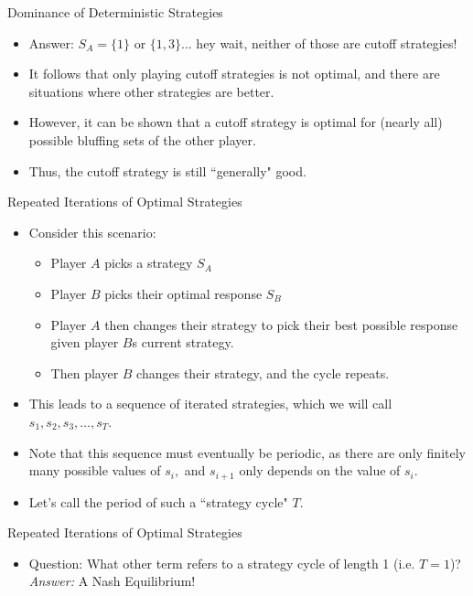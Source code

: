 \documentclass[aspectratio=169]{beamer}
\begin{document}
\begin{frame}{Dominance of Deterministic Strategies}
\begin{itemize}
    \item Answer: $S_A = \{1\}$ or $\{1,3\}$... hey wait, neither of those are cutoff strategies! \pause
    \item It follows that only playing cutoff strategies is not optimal, and there are situations where other strategies are better. \pause
    \item However, it can be shown that a cutoff strategy is optimal for (nearly all) possible bluffing sets of the other player.
    \pause
    \item Thus, the cutoff strategy is still ``generally" good.
\end{itemize}
\end{frame}
\begin{frame}{Repeated Iterations of Optimal Strategies}
\begin{itemize}
    \item Consider this scenario: \pause
    \begin{itemize}
    \item Player $A$ picks a strategy $S_A$ \pause
    \item Player $B$ picks their optimal response $S_B$ \pause
    \item Player $A$ then changes their strategy to pick their best possible response given player $B$s current strategy. \pause
    \item Then player $B$ changes their strategy, and the cycle repeats. \pause
\end{itemize}
    \item This leads to a sequence of iterated strategies, which we will call $s_1,s_2,s_3,\ldots,s_T.$ \pause
    \item Note that this sequence must eventually be periodic, as there are only finitely many possible values of $s_i,$ and $s_{i+1}$ only depends on the value of $s_i.$  \pause
    \item Let's call the period of such a ``strategy cycle" $T.$
    \end{itemize}
    \end{frame}
    \begin{frame}{Repeated Iterations of Optimal Strategies}
    \begin{itemize}
    \item Question: What other term refers to a strategy cycle of length 1 (i.e. $T=1$)? \pause
    \textit{Answer:} A Nash Equilibrium!
    \end{itemize}
    \end{frame}
\end{document}
